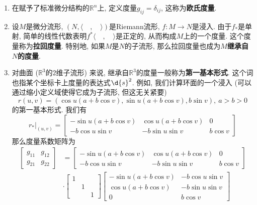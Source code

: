 \begin{eg}
    \begin{enumerate}[(1)]
        \item 在赋予了标准微分结构的$\mathbb{R}^n$上, 定义度量$g_{ij}=\delta_{ij}$, 这称为\textbf{欧氏度量}.
        \item 设$M$是微分流形, $(N,\langle\quad,\quad\rangle)$是Riemann流形, $f:M\to N$是浸入.
        由于$f_*$是单射, 简单的线性代数表明$f^*\langle\quad,\quad\rangle$是正定的, 从而构成$M$上的一个度量.
        这个度量称为\textbf{拉回度量}.
        特别地, 如果$M$是$N$的子流形, 那么拉回度量也成为\textbf{$M$继承自$N$的度量}.
        \item 对曲面 ($\mathbb{R}^3$的$2$维子流形) 来说, 继承自$\mathbb{R}^3$的度量一般称为\textbf{第一基本形式}.
        这个词也指某个坐标卡上度量的表达式$\d{s}^2$.
        例如, 我们计算环面的一个浸入 (可以通过缩小定义域使得它成为子流形, 但这无关紧要)
        \[r(u,v)=(\cos{u}(a+b\cos{v}),\sin{u}(a+b\cos{v}),b\sin{v}),\ a>b>0\]
        的第一基本形式.
        我们有
        \[r_*|_{(u,v)}=\begin{bmatrix}
            -\sin{u}(a+b\cos{v}) & \cos{u}(a+b\cos{v}) & 0\\
            -b\cos{u}\sin{v} & -b\sin{u}\sin{v} & b\cos{v}
        \end{bmatrix}\]
        那么度量系数矩阵为
        \begin{align*}
            \begin{bmatrix}
                g_{11} & g_{12}\\ g_{21} & g_{22}
            \end{bmatrix}&=\begin{bmatrix}
                -\sin{u}(a+b\cos{v}) & \cos{u}(a+b\cos{v}) & 0\\
                -b\cos{u}\sin{v} & -b\sin{u}\sin{v} & b\cos{v}
            \end{bmatrix}\\
            &\cdot\begin{bmatrix}
                1 & & \\ & 1 & \\ & & 1
            \end{bmatrix}\begin{bmatrix}
                -\sin{u}(a+b\cos{v}) & -b\cos{u}\sin{v} \\
                \cos{u}(a+b\cos{v}) & -b\sin{u}\sin{v} \\
                0 & b\cos{v}
            \end{bmatrix}\\

\end{align*}
\end{enumerate}
\end{eg}
